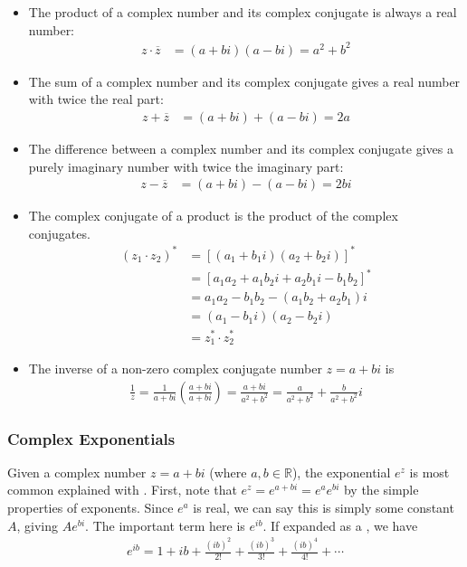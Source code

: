 \begin{itemize}
	\item The product of a complex number and its complex conjugate is always a real number:
	\begin{align}
		z \cdot \overline{z} &= (a+bi)(a-bi) = a^2 + b^2
	\end{align}
	
	\item The sum of a complex number and its complex conjugate gives a real number with twice the real part:
	\begin{align}
		z + \overline{z} &= (a+bi) + (a-bi) = 2a
	\end{align}
	
	\item The difference between a complex number and its complex conjugate gives a purely imaginary number with twice the imaginary part:
	\begin{align}
		z - \overline{z} &= (a+bi) - (a-bi) = 2bi
	\end{align}

	\item The complex conjugate of a product is the product of the complex conjugates.
	\begin{align}
		(z_1 \cdot z_2)^* &= [(a_1+b_1i)(a_2+b_2i)]^* \\ &= [a_1a_2+a_1b_2i+a_2b_1i-b_1b_2]^* \\ &= a_1a_2-b_1b_2 - (a_1b_2+a_2b_1)i \\ &= (a_1-b_1i)(a_2-b_2i) \\
		&= z_1^* \cdot z_2^*
	\end{align}

	\item The inverse of a non-zero complex conjugate number $z=a+bi$ is
	\begin{align}
		\frac{1}{z} = \frac{1}{a+bi}\left(\frac{a+bi}{a+bi}\right) = \frac{a+bi}{a^2+b^2} = \frac{a}{a^2+b^2} + \frac{b}{a^2+b^2}i
	\end{align}
\end{itemize}


\subsubsection{Complex Exponentials}

Given a complex number $z=a+bi$ (where $a,b \in \mathbb{R}$), the exponential $e^z$ is most common explained with . First, note that $e^z = e^{a+bi} = e^ae^{bi}$ by the simple properties of exponents. Since $e^a$ is real, we can say this is simply some constant $A$, giving $Ae^{bi}$. The important term here is $e^{ib}$. If expanded as a , we have
\begin{align}
	e^{ib} = 1 +ib + \frac{(ib)^2}{2!} + \frac{(ib)^3}{3!} + \frac{(ib)^4}{4!} + \cdots
\end{align}

